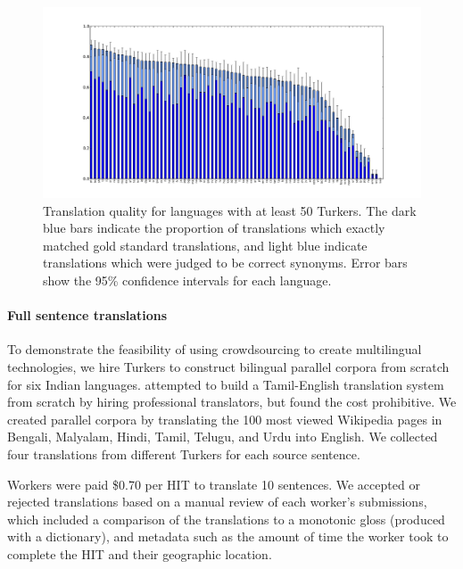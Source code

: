 \documentclass[11pt]{article}
\begin{document}
\begin{figure}[h]
\begin{center}
\includegraphics[width=.8\linewidth]{figures/quality_bar.pdf}
\caption{Translation quality for languages with at least 50 Turkers. The dark blue bars indicate the proportion of translations which exactly matched gold standard translations, and light blue indicate translations which were judged to be correct synonyms. Error bars show the 95\% confidence intervals for each language.}
\label{hitlangqual} 
\end{center}
\end{figure}

\paragraph{Full sentence translations}
To demonstrate the feasibility of using crowdsourcing to create multilingual technologies, we hire Turkers to construct bilingual parallel corpora from scratch for six Indian languages.   attempted to build a Tamil-English translation system from scratch by hiring professional translators, but found the cost prohibitive. We created parallel corpora by translating the 100 most viewed Wikipedia pages in Bengali, Malyalam, Hindi, Tamil, Telugu, and Urdu into English.  We collected four translations from different Turkers for each source sentence.  

Workers were paid \$0.70 per HIT to translate 10 sentences.  
 We  accepted or rejected translations based on a manual review of each worker's submissions, which included a comparison of the translations to a monotonic gloss (produced with a dictionary), and metadata such as the amount of time the worker took to complete the HIT and their geographic location.
\end{document}
